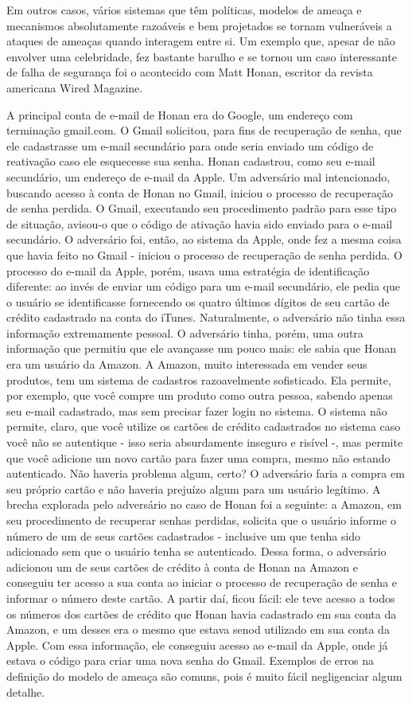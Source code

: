 \documentclass[
	10pt,				%
	openright,			%
	twoside,			%
	a5paper,			%
	english,			%
	french,				%
	spanish,			%
	brazil,				%
	sumario=tradicional
]{abntex2}
\begin{document}
Em outros casos, vários sistemas que têm políticas, modelos de ameaça e mecanismos absolutamente razoáveis e bem projetados se tornam vulneráveis a ataques de ameaças quando interagem entre si. Um exemplo que, apesar de não envolver uma celebridade, fez bastante barulho e se tornou um caso interessante de falha de segurança foi o acontecido com Matt Honan, escritor da revista americana Wired Magazine. 

A principal conta de e-mail de Honan era do Google, um endereço com terminação gmail.com. O Gmail solicitou, para fins de recuperação de senha, que ele cadastrasse um e-mail secundário para onde seria enviado um código de reativação caso ele esquecesse sua senha. Honan cadastrou, como seu e-mail secundário, um endereço de e-mail da Apple. Um adversário mal intencionado, buscando acesso à conta de Honan no Gmail, iniciou o processo de recuperação de senha perdida. O Gmail, executando seu procedimento padrão para esse tipo de situação, avisou-o que o código de ativação havia sido enviado para o e-mail secundário. O adversário foi, então, ao sistema da Apple, onde fez a mesma coisa que havia feito no Gmail - iniciou o processo de recuperação de senha perdida. O processo do e-mail da Apple, porém, usava uma estratégia de identificação diferente: ao invés de enviar um código para um e-mail secundário, ele pedia que o usuário se identificasse fornecendo os quatro últimos dígitos de seu cartão de crédito cadastrado na conta do iTunes. Naturalmente, o adversário não tinha essa informação extremamente pessoal. O adversário tinha, porém, uma outra informação que permitiu que ele avançasse um pouco mais: ele sabia que Honan era um usuário da Amazon. A Amazon, muito interessada em vender seus produtos, tem um sistema de cadastros razoavelmente sofisticado. Ela permite, por exemplo, que você compre um produto como outra pessoa, sabendo apenas seu e-mail cadastrado, mas sem precisar fazer login no sistema. O sistema não permite, claro, que você utilize os cartões de crédito cadastrados no sistema caso você não se autentique - isso seria absurdamente inseguro e risível -, mas permite que você adicione um novo cartão para fazer uma compra, mesmo não estando autenticado. Não haveria problema algum, certo? O adversário faria a compra em seu próprio cartão e não haveria prejuízo algum para um usuário legítimo. A brecha explorada pelo adversário no caso de Honan foi a seguinte: a Amazon, em seu procedimento de recuperar senhas perdidas, solicita que o usuário informe o número de um de seus cartões cadastrados - inclusive um que tenha sido adicionado sem que o usuário tenha se autenticado. Dessa forma, o adversário adicionou um de seus cartões de crédito à conta de Honan na Amazon e conseguiu ter acesso a sua conta ao iniciar o processo de recuperação de senha e informar o número deste cartão. A partir daí, ficou fácil: ele teve acesso a todos os números dos cartões de crédito que Honan havia cadastrado em sua conta da Amazon, e um desses era o mesmo que estava senod utilizado em sua conta da Apple. Com essa informação, ele conseguiu acesso ao e-mail da Apple, onde já estava o código para criar uma nova senha do Gmail. Exemplos de erros na definição do modelo de ameaça são comuns, pois é muito fácil negligenciar algum detalhe. 
\end{document}
